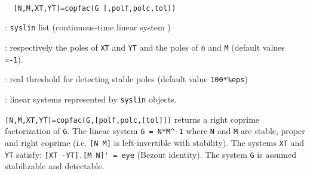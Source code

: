 \begin{mandesc}
   \\ %
\end{mandesc}
\begin{calling_sequence}
\begin{verbatim}
  [N,M,XT,YT]=copfac(G [,polf,polc,tol])   
\end{verbatim}
\end{calling_sequence}
\begin{parameters}
  \begin{varlist}
    : \verb!syslin! list  (continuous-time linear system )

    : respectively the poles of \verb!XT! and \verb!YT! and
    the poles of \verb!n!  and \verb!M! (default values \verb!=-1!).
    
    : real threshold for detecting stable poles (default value \verb!100*%eps!)
    
    : linear systems represented by \verb!syslin! objects.
  \end{varlist}
\end{parameters}
\begin{mandescription}
  \verb![N,M,XT,YT]=copfac(G,[polf,polc,[tol]])! returns a right coprime
  factorization of \verb!G!. The linear system \verb!G = N*M^-1! where \verb!N! and \verb!M! are
  stable, proper and right coprime (i.e. \verb![N M]! is left-invertible with
  stability). The systems \verb!XT! and \verb!YT! satisfy: \verb![XT -YT].[M N]' = eye! (Bezout
  identity). The system \verb!G! is assumed stabilizable and detectable.
\end{mandescription}
\begin{manseealso}
     
\end{manseealso}
